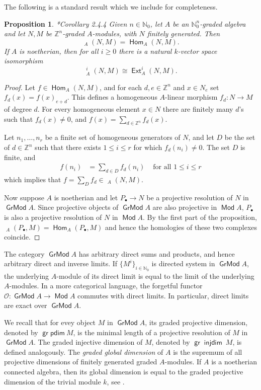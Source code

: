 \documentclass[11pt,fleqn]{article}
\theoremstyle{plain}
\newtheorem{Proposition}[Theorem]{Proposition}
\theoremstyle{remark}
\theoremstyle{definition}
\newcommand\NN{\mathbb N}
\newcommand\ZZ{\mathbb Z}
\renewcommand\to{\longrightarrow}
\renewcommand\O{\mathcal O}
\newcommand\pdim{\mathsf{pdim}}
\DeclareMathOperator\Mod{\mathsf{Mod}}
\DeclareMathOperator\Hom{\mathsf{Hom}}
\DeclareMathOperator\Ext{\mathsf{Ext}}
\DeclareMathOperator\Gr{\mathsf{GrMod}}
\DeclareMathOperator\GrHom{\underline{\mathsf{Hom}}}
\DeclareMathOperator\GrExt{\underline{\mathsf{Ext}}}
\DeclareMathOperator\gr{\mathsf{gr}}
\DeclareMathOperator\injdim{\mathsf{injdim}}
\begin{document}
The following is a standard result which we include for completeness.
\begin{Proposition}\cite{NV}*{Corollary 2.4.4}
\label{grhom-hom}
	Given $n \in \NN_0$, let $A$ be an $\NN_0^n$-graded algebra and let $N, M$ be
	$\ZZ^n$-graded $A$-modules, with $N$ finitely generated. Then
	$$ \GrHom_A(N,M) = \Hom_A(N,M).$$
	If $A$ is noetherian, then for all $i \geq 0$ there is a natural $k$-vector 
	space isomorphism
	$$ \GrExt_A^i(N,M) \cong \Ext_A^i(N,M).$$
\end{Proposition}
\begin{proof}
	Let $f \in \Hom_A(N,M)$, and for each $d,e \in \ZZ^n$ and $x \in N_{e}$ set
	$f_d(x) = f(x)_{e+d}$. This defines a homogeneous $A$-linear morphism $f_d: 
	N \to M$ of degree $d$. For every homogeneous element $x \in N$ there are finitely
	many $d$'s such that $f_d(x) \neq 0$, and $f(x) = \sum_{d \in \ZZ^n}f_d(x)$.
	
	Let $n_1, \ldots, n_r$ be a finite set of homogeneous generators of $N$, and let
	$D$ be the set of $d \in \ZZ^n$ such that there exists $1 \leq i \leq r$ for which
	$f_d(n_i) \neq 0$. The set $D$ is finite, and
	\begin{align*}
		f(n_i) &= \sum_{d \in D} f_d(n_i) & \mbox{ for all } 1 \leq i \leq r 
	\end{align*}
	which implies that $f = \sum_D f_d \in \GrHom_A(N,M)$.

	Now suppose $A$ is noetherian and let $P_\bullet \to N$ be a projective resolution
	of $N$ in $\Gr A$. Since projective objects of $\Gr A$ are also projective in 
	$\Mod A$, $P_\bullet$ is also a projective resolution of $N$ in $\Mod A$. By the first
	part of the proposition, $\GrHom_A (P_\bullet,M) = \Hom_A(P_\bullet,M)$ and hence 
	the homologies of these	two complexes coincide. 
\end{proof}

The category $\Gr A$ has arbitrary direct sums and products, and hence arbitrary direct
and inverse limits. If $\{M^i\}_{i \in \NN_0}$ is directed system in $\Gr A$, the
underlying $A$-module of its direct limit is equal to the limit of the underlying
$A$-modules. In a more categorical language, the  forgetful functor $\O: \Gr A \to
\Mod A$ commutes with direct limits. In particular, direct limits are exact over $\Gr A$.

We recall that for evey object $M$ in $\Gr A$, its graded projective dimension, denoted by
$\gr \pdim~M$, is the minimal length of a projective resolution of $M$ in $\Gr A$. The
graded injective dimension of $M$, denoted by $\gr \injdim~M$, is defined analogously. The
\emph{graded global dimension} of $A$ is the supremum of all projective dimensions of
finitely generated graded $A$-modules. If $A$ is a noetherian connected algebra, then its
global dimension is equal to the graded projective dimension of the trivial module $k$,
see \cite{RZ2}.
\end{document}
